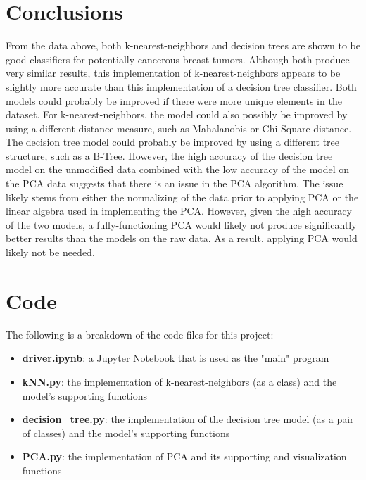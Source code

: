 \documentclass[12pt]{article}
\begin{document}
    \section{Conclusions}
    From the data above, both k-nearest-neighbors and decision trees are shown to be good classifiers for potentially cancerous breast tumors. Although both produce very similar results, this implementation of k-nearest-neighbors appears to be slightly more accurate than this implementation of a decision tree classifier. Both models could probably be improved if there were more unique elements in the dataset. For k-nearest-neighbors, the model could also possibly be improved by using a different distance measure, such as Mahalanobis or Chi Square distance. The decision tree model could probably be improved by using a different tree structure, such as a B-Tree. However, the high accuracy of the decision tree model on the unmodified data combined with the low accuracy of the model on the PCA data suggests that there is an issue in the PCA algorithm. The issue likely stems from either the normalizing of the data prior to applying PCA or the linear algebra used in implementing the PCA. However, given the high accuracy of the two models, a fully-functioning PCA would likely not produce significantly better results than the models on the raw data. As a result, applying PCA would likely not be needed. 
    
    \section{Code}
    The following is a breakdown of the code files for this project:
    \begin{itemize}
    	\item \textbf{driver.ipynb}: a Jupyter Notebook that is used as the "main" program
    	\item \textbf{kNN.py}: the implementation of k-nearest-neighbors (as a class) and the model's supporting functions
    	\item \textbf{decision\_tree.py}: the implementation of the decision tree model (as a pair of classes) and the model's supporting functions
    	\item \textbf{PCA.py}: the implementation of PCA and its supporting and visualization functions
    \end{itemize}
    
    \newpage
\end{document}
